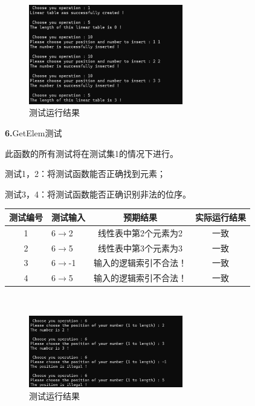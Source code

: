 \documentclass[supercite]{Experimental_Report}
\theoremstyle{definition}
\begin{document}
 \begin{figure}[H]
 	\centering
 	\includegraphics[width=0.6\textwidth]{images/线性表测试5.png}
 	\caption{测试运行结果}
 	\label{txlab}
 \end{figure}


\noindent\textbf{ 6.}GetElem测试

此函数的所有测试将在测试集1的情况下进行。

测试1，2：将测试函数能否正确找到元素；

测试3，4：将测试函数能否正确识别非法的位序。

\vspace{0.5em}

\begin{tabular}{|c|l|c|c|}
	\hline
	测试编号 & 测试输入 & 预期结果 & 实际运行结果 \\
	\hline
	1 & 6$\rightarrow$2 & 线性表中第2个元素为2 & 一致 \\
	\hline
	2 & 6$\rightarrow$5 & 线性表中第3个元素为3 & 一致 \\
	\hline
	3 & 6$\rightarrow$-1 & 输入的逻辑索引不合法！ & 一致 \\
	\hline
	4 & 6$\rightarrow$5 & 输入的逻辑索引不合法！ & 一致 \\
	\hline
\end{tabular}

~\

 \begin{figure}[H]
 	\centering
 	\includegraphics[width=0.6\textwidth]{images/线性表测试6.png}
 	\caption{测试运行结果}
 	\label{txlab}
 \end{figure}
\end{document}
